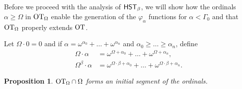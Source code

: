 \documentclass[UKenglish,cleveref,DIV=12]{scrartcl}
\newtheorem{proposition}[lemma]{Proposition}
\theoremstyle{definition}
\theoremstyle{definition}
\begin{document}
Before we proceed with the analysis of $\mathsf{HST}_\beta$, we will show how the ordinals
$\alpha\ge\Omega$ in $\mathrm{OT}_\Omega$ enable the generation of the $\varphi_\alpha$
functions for $\alpha<\Gamma_0$ and that $\mathrm{OT}_\Omega$ properly extends $\mathrm{OT}$.

Let $\Omega\cdot0=0$ and if $\alpha=\omega^{\alpha_0}+\dots+\omega^{\alpha_n}$
and $\alpha_0\ge\dots\ge\alpha_n$, define
\begin{align*}
  \Omega\cdot\alpha&=\omega^{\Omega+\alpha_0}+\dots+\omega^{\Omega+\alpha_n},\\
  \Omega^\beta\cdot\alpha&=\omega^{\Omega\cdot\beta+\alpha_0}+
\dots+\omega^{\Omega\cdot\beta+\alpha_n}.
\end{align*}
\begin{proposition}\label{prop:thetaord}
 $\mathrm{OT}_\Omega\cap \Omega$ forms an initial segment of the ordinals.
\end{proposition}
\end{document}
